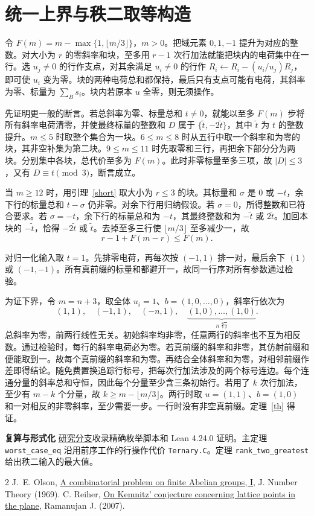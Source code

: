 \documentclass[UTF8,scheme=plain,a4paper,11pt]{ctexart}
\begin{document}
\newpage
\section{统一上界与秩二取等构造}
令 $F(m)=m-\max\{1,\lfloor m/3\rfloor\}$，$m>0$。把域元素 $0,1,-1$ 提升为对应的整数。对大小为 $r$ 的零斜率和块，至多用 $r-1$ 次行加法就能把块内的电荷集中在一行。选 $u_j\ne0$ 的行作支点，对其余满足 $u_i\ne0$ 的行作 $R_i\gets R_i-(u_i/u_j)R_j$，即可使 $u_i$ 变为零。块的两种电荷总和都保持，最后只有支点可能有电荷，其斜率为零、标量为 $\sum_B s_i$。块内若原本 $u$ 全零，则无须操作。

先证明更一般的断言。若总斜率为零、标量总和 $t\ne0$，就能以至多 $F(m)$ 步将所有斜率电荷清零，并使最终标量的整数和 $D$ 属于 $\{\tilde t,-2\tilde t\}$，其中 $\tilde t$ 为 $t$ 的整数提升。$m\le5$ 时取整个集合为一块。$6\le m\le8$ 时从五行中取一个斜率和为零的块，其非空补集为第二块。$9\le m\le11$ 时先取零和三行，再把余下部分分为两块。分别集中各块，总代价至多为 $F(m)$。此时非零标量至多三项，故 $|D|\le3$，又有 $D\equiv t\pmod3$，断言成立。

当 $m\ge12$ 时，用引理~\ref{short} 取大小为 $r\le3$ 的块。其标量和 $\sigma$ 是 $0$ 或 $-t$，余下行的标量总和 $t-\sigma$ 仍非零。对余下行用归纳假设。若 $\sigma=0$，所得整数和已符合要求。若 $\sigma=-t$，余下行的标量总和为 $-t$，其最终整数和为 $-\tilde t$ 或 $2\tilde t$。加回本块的 $-\tilde t$，恰得 $-2\tilde t$ 或 $\tilde t$。去掉至多三行使 $\lfloor m/3\rfloor$ 至多减少一，故
\[
 r-1+F(m-r)\le F(m).
\]

对归一化输入取 $t=1$。先排零电荷，再每次按 $(-1,1)$ 排一对，最后余下 $(1)$ 或 $(-1,-1)$。所有真前缀的标量和都避开一，故同一行序对所有参数通过检验。

为证下界，令 $m=n+3$，取全体 $u_i=1$、$b=(1,0,\ldots,0)$，斜率行依次为
\[
 (1,1),\quad(-1,1),\quad(-n,1),\quad
 \underbrace{(1,0),\ldots,(1,0)}_{n\text{ 行}}.
\]
总斜率为零，前两行线性无关。初始斜率均非零，任意两行的斜率也不互为相反数。通过检验时，每行的斜率电荷必为零。若真前缀的斜率和非零，其仿射前缀和便能取到一。故每个真前缀的斜率和为零。再结合全体斜率和为零，对相邻前缀作差即得结论。随免费置换追踪行标号，把每次行加法涉及的两个标号连边。每个连通分量的斜率总和守恒，因此每个分量至少含三条初始行。若用了 $k$ 次行加法，至少有 $m-k$ 个分量，故 $k\ge m-\lfloor m/3\rfloor$。两行时取 $u=(1,1)$、$b=(1,0)$ 和一对相反的非零斜率，至少需要一步。一行时没有非空真前缀。定理~\ref{th} 得证。

\smallskip\noindent\textbf{复算与形式化}\quad
\href{https://github.com/SHIN09-git/integer-mult-bounds/tree/codex/ternary-guard-affine-quotient/research/monomial-guard-affine-quotient}{研究分支}收录精确枚举脚本和 Lean 4.24.0 证明。主定理 \texttt{worst\_case\_eq} 沿用前序工作的行操作代价 \texttt{Ternary.C}。定理 \texttt{rank\_two\_greatest} 给出秩二输入的最大值。
\begin{thebibliography}{2}\footnotesize
{} J.~E. Olson, \href{https://doi.org/10.1016/0022-314X(69)90021-3}{A combinatorial problem on finite Abelian groups, I}, J. Number Theory (1969).
 C. Reiher, \href{https://www.math.uni-hamburg.de/en/personen/reiher/artikel/Kemnitz.pdf}{On Kemnitz' conjecture concerning lattice points in the plane}, Ramanujan J. (2007).
\end{thebibliography}
\end{document}
